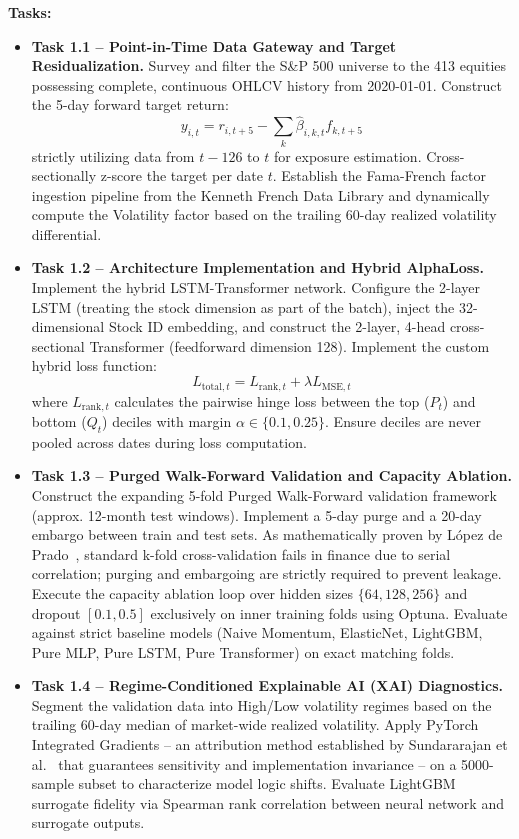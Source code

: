 \documentclass[twoside,final]{hcmut-report}
\begin{document}
\vspace{0.5em}
\textbf{Tasks:}
\begin{itemize}
    \item \textbf{Task 1.1 -- Point-in-Time Data Gateway and Target Residualization.} Survey and filter the S\&P 500 universe to the 413 equities possessing complete, continuous OHLCV history from 2020-01-01. Construct the 5-day forward target return:
          \[
              y_{i,t} = r_{i,t+5} - \sum_{k}\hat{\beta}_{i,k,t}f_{k,t+5}
          \]
          strictly utilizing data from $t-126$ to $t$ for exposure estimation. Cross-sectionally z-score the target per date $t$. Establish the Fama-French factor ingestion pipeline from the Kenneth French Data Library and dynamically compute the Volatility factor based on the trailing 60-day realized volatility differential.

    \item \textbf{Task 1.2 -- Architecture Implementation and Hybrid AlphaLoss.} Implement the hybrid LSTM-Transformer network. Configure the 2-layer LSTM (treating the stock dimension as part of the batch), inject the 32-dimensional Stock ID embedding, and construct the 2-layer, 4-head cross-sectional Transformer (feedforward dimension 128). Implement the custom hybrid loss function:
          \[
              L_{\text{total},t} = L_{\text{rank},t} + \lambda L_{\text{MSE},t}
          \]
          where $L_{\text{rank},t}$ calculates the pairwise hinge loss between the top ($P_t$) and bottom ($Q_t$) deciles with margin $\alpha \in \{0.1, 0.25\}$. Ensure deciles are never pooled across dates during loss computation.

    \item \textbf{Task 1.3 -- Purged Walk-Forward Validation and Capacity Ablation.} Construct the expanding 5-fold Purged Walk-Forward validation framework (approx. 12-month test windows). Implement a 5-day purge and a 20-day embargo between train and test sets. As mathematically proven by López de Prado~\cite{LopezdePrado2018}, standard k-fold cross-validation fails in finance due to serial correlation; purging and embargoing are strictly required to prevent leakage. Execute the capacity ablation loop over hidden sizes $\{64, 128, 256\}$ and dropout $[0.1, 0.5]$ exclusively on inner training folds using Optuna. Evaluate against strict baseline models (Naive Momentum, ElasticNet, LightGBM, Pure MLP, Pure LSTM, Pure Transformer) on exact matching folds.

    \item \textbf{Task 1.4 -- Regime-Conditioned Explainable AI (XAI) Diagnostics.} Segment the validation data into High/Low volatility regimes based on the trailing 60-day median of market-wide realized volatility. Apply PyTorch Integrated Gradients -- an attribution method established by Sundararajan et al.~\cite{Sundararajan2017} that guarantees sensitivity and implementation invariance -- on a 5000-sample subset to characterize model logic shifts. Evaluate LightGBM surrogate fidelity via Spearman rank correlation between neural network and surrogate outputs.
\end{itemize}
\end{document}
